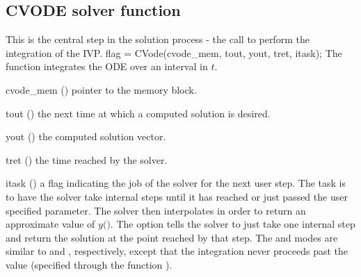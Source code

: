 
\subsection{CVODE solver function}\label{sss:cvode}
%
This is the central step in the solution process - the call to perform the integration 
of the IVP.
%
{
  flag = CVode(cvode\_mem, tout, yout, tret, itask);
}
{
  The function  integrates the ODE over an interval in $t$.
}
{
  \begin{args}
  \item[cvode\_mem] ()
    pointer to the {\cvode} memory block.
  \item[tout] ()
    the next time at which a computed solution is desired.
  \item[yout] ()
    the computed solution vector.
  \item[tret] ()
    the time reached by the solver.
  \item[itask] ()
    a flag indicating the job of the solver for the next user step. 
    The  task is to have the solver take internal steps until   
    it has reached or just passed the user specified 
    parameter. The solver then interpolates in order to   
    return an approximate value of $y($$)$. 
    The  option tells the solver to just take one internal step  
    and return the solution at the point reached by that step. 
    The  and  modes are     
    similar to  and , respectively, except    
    that the integration never proceeds past the value      
     (specified through the function ).
  \end{args}
}
